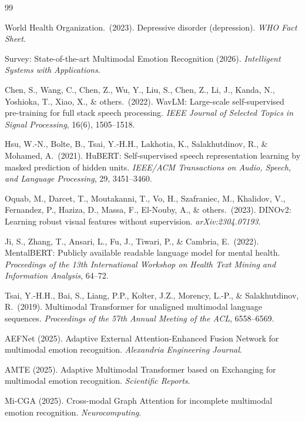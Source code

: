\documentclass{article}
\begin{document}
{\small
\begin{thebibliography}{99}

  World Health Organization.\ (2023).
  Depressive disorder (depression).
  \textit{WHO Fact Sheet}.

  Survey: State-of-the-art Multimodal Emotion Recognition (2026).
  \textit{Intelligent Systems with Applications}.

  Chen, S., Wang, C., Chen, Z., Wu, Y., Liu, S., Chen, Z., Li, J., Kanda, N.,
  Yoshioka, T., Xiao, X., \& others.\ (2022).
  WavLM: Large-scale self-supervised pre-training for full stack speech processing.
  \textit{IEEE Journal of Selected Topics in Signal Processing}, 16(6), 1505--1518.

  Hsu, W.-N., Bolte, B., Tsai, Y.-H.H., Lakhotia, K., Salakhutdinov, R., \&
  Mohamed, A.\ (2021).
  HuBERT: Self-supervised speech representation learning by masked prediction of hidden
  units. \textit{IEEE/ACM Transactions on Audio, Speech, and Language Processing}, 29,
  3451--3460.

  Oquab, M., Darcet, T., Moutakanni, T., Vo, H., Szafraniec, M., Khalidov, V.,
  Fernandez, P., Haziza, D., Massa, F., El-Nouby, A., \& others.\ (2023).
  DINOv2: Learning robust visual features without supervision.
  \textit{arXiv:2304.07193}.

  Ji, S., Zhang, T., Ansari, L., Fu, J., Tiwari, P., \& Cambria, E.\ (2022).
  MentalBERT: Publicly available readable language model for mental health.
  \textit{Proceedings of the 13th International Workshop on Health Text Mining and
  Information Analysis}, 64--72.

  Tsai, Y.-H.H., Bai, S., Liang, P.P., Kolter, J.Z., Morency, L.-P., \&
  Salakhutdinov, R.\ (2019).
  Multimodal Transformer for unaligned multimodal language sequences.
  \textit{Proceedings of the 57th Annual Meeting of the ACL}, 6558--6569.

  AEFNet (2025).
  Adaptive External Attention-Enhanced Fusion Network for multimodal emotion recognition.
  \textit{Alexandria Engineering Journal}.

  AMTE (2025).
  Adaptive Multimodal Transformer based on Exchanging for multimodal emotion recognition.
  \textit{Scientific Reports}.

  Mi-CGA (2025).
  Cross-modal Graph Attention for incomplete multimodal emotion recognition.
  \textit{Neurocomputing}.


\end{thebibliography}}
\end{document}
